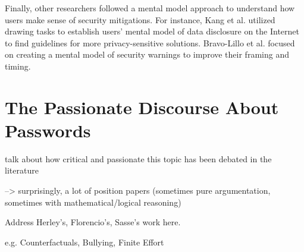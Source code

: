 	Finally, other researchers followed a mental model approach to understand how users make sense of security mitigations. For instance, Kang et al. utilized drawing tasks to establish users' mental model of data disclosure on the Internet \cite{Kang2015MentalModelsDrawing} to find guidelines for more privacy-sensitive solutions. Bravo-Lillo et al. focused on creating a mental model of security warnings \cite{BravoLillo2011WarningsMentalModel} to improve their framing and timing.
	
	
	\cite{Bojinov2010KamouflagePWM}
	
	\cite{Fagan2017UsersConsiderationsPWMs}
	
	
	
\section{The Passionate Discourse About Passwords}\label{sec:rw:passionate_discourse}
talk about how critical and passionate this topic has been debated in the literature

--> surprisingly, a lot of position papers (sometimes pure argumentation, sometimes with mathematical/logical reasoning) 

Address Herley's, Florencio's, Sasse's work here. 

e.g. Counterfactuals, Bullying, Finite Effort 
